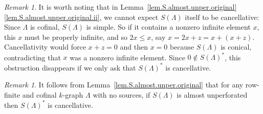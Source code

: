 \documentclass[a4paper, 12pt]{amsart}
\numberwithin{equation}{section}
\newcounter{theorem}
\theoremstyle{remark}
\newtheorem{remark}[theorem]{Remark}
\theoremstyle{definition}
\begin{document}
\begin{remark}
It is worth noting that in Lemma~\ref{lem.S.almost.unper.original}\eqref{lem.S.almost.unper.original.ii}, we cannot expect
$S(\Lambda)$ itself to be cancellative: Since $\Lambda$ is cofinal, $S(\Lambda)$ is
simple. So if it contains a nonzero infinite element $x$, this $x$ must be properly
infinite, and so $2x \leq x$, say $x = 2x + z = x + (x + z)$. Cancellativity would force
$x + z = 0$ and then $x = 0$ because $S(\Lambda)$ is conical, contradicting that $x$ was
a nonzero infinite element. Since $0 \not\in S(\Lambda)^*$, this obstruction disappears
if we only ask that $S(\Lambda)^*$ is cancellative.
\end{remark}

\begin{remark}\label{rem.almost.cancel}
It follows from Lemma~\ref{lem.S.almost.unper.original} that for any row-finite and
cofinal $k$-graph $\Lambda$ with no sources, if $S(\Lambda)$ is almost
unperforated then $S(\Lambda)^*$ is cancellative.
\end{remark}
\end{document}
